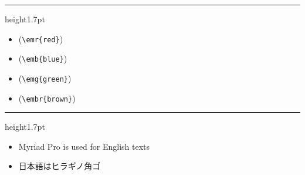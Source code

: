 \documentclass[xelatex,ja=standard,jafont=hiragino-pron,fleqn,no-math,base=35pt,paper={1189truemm}{841truemm},twocolumn]{bxjsslidemd}
\newcommand{\varhrulefill}[1][1.7pt]{\leavevmode\leaders\hrule height#1\hfill\kern0pt}
\renewcommand{\section}[1]%
{\vspace*{14pt}\noindent\begingroup\color{green}{\Large\bfseries #1}\hspace*{-2.2pt}\varhrulefill\endgroup\vspace*{5pt}}
\begin{document}
\section{Colors}
\begin{itemize}
 \item {} (\verb|\emr{red}|)
 \item {} (\verb|\emb{blue}|)
 \item {} (\verb|\emg{green}|)
 \item {} (\verb|\embr{brown}|)
\end{itemize}

\newpage
\section{Fonts}
\begin{itemize}
 \item Myriad Pro is used for English texts
 \item 日本語はヒラギノ角ゴ
\end{itemize}
\end{document}
